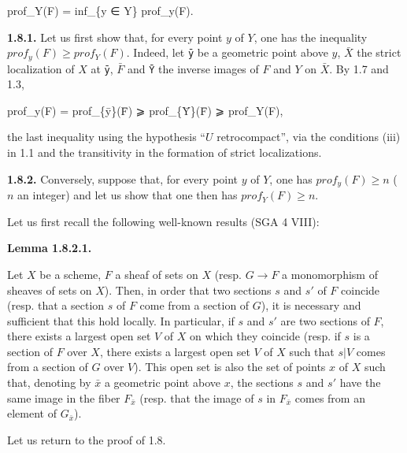 \documentclass[
]{article}
\newenvironment{Shaded}{}{}
\newcommand{\NormalTok}[1]{#1}
\begin{document}
\begin{Shaded}
\begin{Highlighting}[]
\NormalTok{prof\_Y(F) = inf\_\{y ∈ Y\} prof\_y(F).}
\end{Highlighting}
\end{Shaded}

\textbf{1.8.1.} Let us first show that, for every point \(y\) of \(Y\),
one has the inequality \(prof_{y}(F) \geqslant prof_{Y}(F)\). Indeed,
let \texttt{ȳ} be a geometric point above \(y\), \(\bar{X}\) the strict
localization of \(X\) at \texttt{ȳ}, \(\bar{F}\) and \texttt{Ȳ} the
inverse images of \(F\) and \(Y\) on \(\bar{X}\). By 1.7 and 1.3,

\begin{Shaded}
\begin{Highlighting}[]
\NormalTok{prof\_y(F) = prof\_\{ȳ\}(F̄) ⩾ prof\_\{Ȳ\}(F̄) ⩾ prof\_Y(F),}
\end{Highlighting}
\end{Shaded}

the last inequality using the hypothesis ``\(U\) retrocompact'', via the
conditions (iii) in 1.1 and the transitivity in the formation of strict
localizations.

\textbf{1.8.2.} Conversely, suppose that, for every point \(y\) of
\(Y\), one has \(prof_{y}(F) \geqslant n\) (\(n\) an integer) and let us
show that one then has \(prof_{Y}(F) \geqslant n\).

Let us first recall the following well-known results (SGA 4 VIII):

\textbf{Lemma 1.8.2.1.}

Let \(X\) be a scheme, \(F\) a sheaf of sets on \(X\) (resp. \(G \to F\)
a monomorphism of sheaves of sets on \(X\)). Then, in order that two
sections \(s\) and \(s'\) of \(F\) coincide (resp. that a section \(s\)
of \(F\) come from a section of \(G\)), it is necessary and sufficient
that this hold locally. In particular, if \(s\) and \(s'\) are two
sections of \(F\), there exists a largest open set \(V\) of \(X\) on
which they coincide (resp. if \(s\) is a section of \(F\) over \(X\),
there exists a largest open set \(V\) of \(X\) such that \(s|V\) comes
from a section of \(G\) over \(V\)). This open set is also the set of
points \(x\) of \(X\) such that, denoting by \(\bar{x}\) a geometric
point above \(x\), the sections \(s\) and \(s'\) have the same image in
the fiber \(F_{\bar{x}}\) (resp. that the image of \(s\) in
\(F_{\bar{x}}\) comes from an element of \(G_{\bar{x}}\)).

Let us return to the proof of 1.8.
\end{document}
